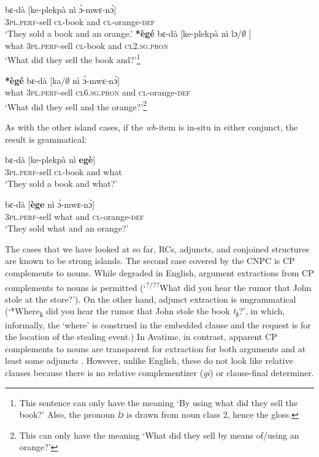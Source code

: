 \documentclass[output=paper]{langscibook}
\begin{document}
\ea \label{ex:devlin:csc}
\begin{xlist}
\ex \label{ex:devlin:csc-base}
\gll  bɛ-d\`{a} [ke-plekp\`{a} n\`{i} \`{ɔ}-mwɛ-n\`{ɔ}]\\
3\textsc{pl.perf}-sell \textsc{cl}-book and \textsc{cl}-orange-\textsc{def}  \\
\glt `They sold a book and an orange.’
\ex \label{ex:devlin:csc-move-sec-conj}
\gll \textbf{*\`{e}g\'{e}} bɛ-d\`{a} [ke-plekp\`{a} n\`{i} lɔ/$\emptyset$ ] \\
 what 3\textsc{pl.perf}-sell \textsc{cl}-book and \textsc{cl2.sg.pron} {}\\
\glt `What did they sell the book  and?’\footnote{This sentence can  only have the meaning `By using what did they sell the book?' Also, the pronoun \textit{lɔ} is drawn from noun class 2, hence the gloss.}

\ex \label{ex:devlin:csc-move-first-conj}
\gll \textbf{*\`{e}g\'{e}} bɛ-d\`{a} [ka/$\emptyset$ n\`{i} \`{ɔ}-mwɛ-n\`{ɔ}]\\
what 3\textsc{pl.perf}-sell \textsc{cl6.sg.pron}{} and \textsc{cl}-orange-\textsc{def} \\
\glt `What did they sell and the orange?’\footnote{This can only have the meaning `What did they sell by means of/using an orange?'}
\end{xlist}
\z

As with the other island cases, if the \textit{wh}-item is in-situ in either conjunct, the result is grammatical:

\ea
\begin{xlist}
\ex %
\gll bɛ-d\`{a} [ke-plekp\`{a} n\`{i} \textbf{eg\`{e}}]\\
3\textsc{pl.perf}-sell \textsc{cl}-book and what  \\
\glt `They sold a book and what?’

\ex %
\gll  bɛ-d\`{a} [\textbf{\`{e}ge} n\`{i} \`{ɔ}-mwɛ-n\`{ɔ}]\\
3\textsc{pl.perf}-sell what and \textsc{cl}-orange-\textsc{def}  \\
\glt `They sold what and an orange?’
\end{xlist}
\z


The cases that we have looked at so far, RCs, adjuncts, and conjoined structures are known to be strong islands. The second case covered by the CNPC is CP complements to nouns. While degraded in English, argument extractions from CP complements to nouns is permitted (`\textsuperscript{?/??}What did you hear the rumor that John stole at the store?’). On the other hand, adjunct extraction is ungrammatical (`*Where\textsubscript{k} did you hear the rumor that John stole the book \textit{t\textsubscript{k}}?', in which, informally, the `where' is construed in the embedded clause and the request is for the location of the stealing event.) In Avatime, in contrast, apparent CP complements to nouns are transparent for extraction for both arguments  and at least some adjuncts .  However, unlike English, these do not look like relative clauses because there is no relative complementizer (\textit{gi}) or clause-final determiner.
\end{document}
